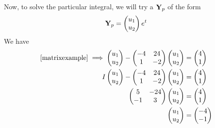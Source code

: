 \documentclass{article}
\begin{document}
Now, to solve the particular integral, we will try a $\vb Y_p$ of the form
\[ \vb Y_p = \begin{pmatrix}
        u_1 \\ u_2
    \end{pmatrix} e^t \]
We have
\begin{align*}
    \eqref{matrixexample} \implies \begin{pmatrix}
        u_1 \\ u_2
    \end{pmatrix} - \begin{pmatrix}
        -4 & 24 \\ 1 & -2
    \end{pmatrix}\begin{pmatrix}
        u_1 \\ u_2
    \end{pmatrix} & = \begin{pmatrix}
        4 \\ 1
    \end{pmatrix} \\
    I\begin{pmatrix}
        u_1 \\ u_2
    \end{pmatrix} - \begin{pmatrix}
        -4 & 24 \\ 1 & -2
    \end{pmatrix}\begin{pmatrix}
        u_1 \\ u_2
    \end{pmatrix}                               & = \begin{pmatrix}
        4 \\ 1
    \end{pmatrix} \\
    \begin{pmatrix}
        5 & -24 \\ -1 & 3
    \end{pmatrix}\begin{pmatrix}
        u_1 \\ u_2
    \end{pmatrix}                                                              & = \begin{pmatrix}
        4 \\ 1
    \end{pmatrix} \\
    \begin{pmatrix}
        u_1 \\ u_2
    \end{pmatrix}                                                                                         & = \begin{pmatrix}
        -4 \\ -1
    \end{pmatrix}
\end{align*}
\end{document}
